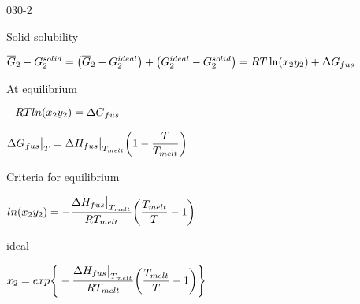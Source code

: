 \begin{mitframe} {030-2}
        
\begin{listone}

\item Solid solubility

		\begin{listtwo}
		\item$\overline{\gibbs}_2-\gibbs_2^{solid}=\big(\overline{\gibbs}_2-\gibbs_2^{ideal}\big)+\big(\gibbs_2^{ideal}-\gibbs_2^{solid}\big)=\gasconst\Temp\ln(\specfrac{2}y_{2})+\iipf\gibbs_{fus}$
        
        \item At equilibrium
        		\begin{listthree}
                \item$-\gasconst\Temp{ln}(\specfrac{2}y_2)=\iipf\gibbs_{fus}$
                \item$\iipf\gibbs_{fus}\big|_{\Temp}=\iipf\enthalpy_{fus}\big|_{\Temp_{melt}}\bigg(1-\dfrac{\Temp}{\Temp_{melt}}\bigg)$
                
                \item Criteria for equilibrium
						\begin{listfour}
                        \item$ ln(\specfrac{2}y_2)=-\dfrac{\iipf\enthalpy_{fus}\big|_{\Temp_{melt}}}{\gasconst\Temp_{melt}}\bigg(\dfrac{\Temp_{melt}}{\Temp}-1\bigg)$
                        \item ideal	
                        		\begin{listfive}
                                \item$\specfrac{2}=exp\Bigg\{-\dfrac{\iipf\enthalpy_{fus}\big|_{\Temp_{melt}}}{\gasconst\Temp_{melt}}\bigg(\dfrac{\Temp_{melt}}{\Temp}-1\bigg)
\Bigg\}$


 
 \end{listfive}
                        
                        
\end{listfour}
\end{listthree}

\end{listtwo}

\end{listone}
\end{mitframe}
